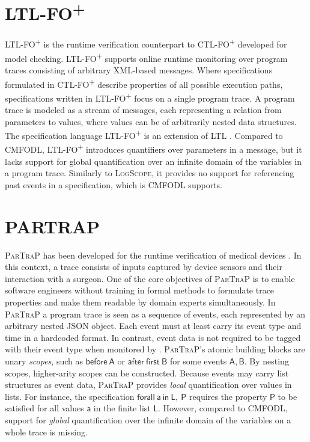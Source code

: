 \section{LTL-FO\textsuperscript{+}}
LTL-FO\textsuperscript{+} \cite{halleRuntimeMonitoringMessageBased2008} is the runtime verification counterpart to CTL-FO\textsuperscript{+} \cite{halleModelCheckingDataAware2007} developed for model checking. LTL-FO\textsuperscript{+} supports online runtime monitoring over program traces consisting of arbitrary XML-based messages. Where specifications formulated in CTL-FO\textsuperscript{+} describe properties of all possible execution paths, specifications written in LTL-FO\textsuperscript{+} focus on a single program trace. A program trace is modeled as a stream of messages, each representing a relation from parameters to values, where values can be of arbitrarily nested data structures. The specification language LTL-FO\textsuperscript{+} is an extension of LTL \cite{bauerRuntimeVerificationLTL2011}. Compared to CMFODL, LTL-FO\textsuperscript{+} introduces quantifiers over parameters in a message, but it lacks support for global quantification over an infinite domain of the variables in a program trace. Similarly to \textsc{LogScope}, it provides no support for referencing past events in a specification, which is CMFODL supports.

\section{PARTRAP}
\textsc{ParTraP} has been developed for the runtime verification of medical devices \cite{bleinExtendingSpecificationPatterns2018}. In this context, a trace consists of inputs captured by device sensors and their interaction with a surgeon. One of the core objectives of \textsc{ParTraP} is to enable software engineers without training in formal methods to formulate trace properties and make them readable by domain experts simultaneously. In \textsc{ParTraP} a program trace is seen as a sequence of events, each represented by an arbitrary nested JSON object. Each event must at least carry its event type and time in a hardcoded format. In contrast, event data is not required to be tagged with their event type when monitored by \MonPolyN. \textsc{ParTraP}'s atomic building blocks are unary \textit{scopes}, such as $\mathsf{before\ A}$ or $\mathsf{after\ first\ B}$ for some events $\mathsf{A, B}$. By nesting scopes, higher-arity scopes can be constructed. Because events may carry list structures as event data, \textsc{ParTraP} provides \textit{local} quantification over values in lists. For instance, the specification $\mathsf{forall\ a\ in\ L,\ P}$ requires the property $\mathsf{P}$ to be satisfied for all values $\mathsf{a}$ in the finite list $\mathsf{L}$. However, compared to CMFODL, support for \textit{global} quantification over the infinite domain of the variables on a whole trace is missing.

